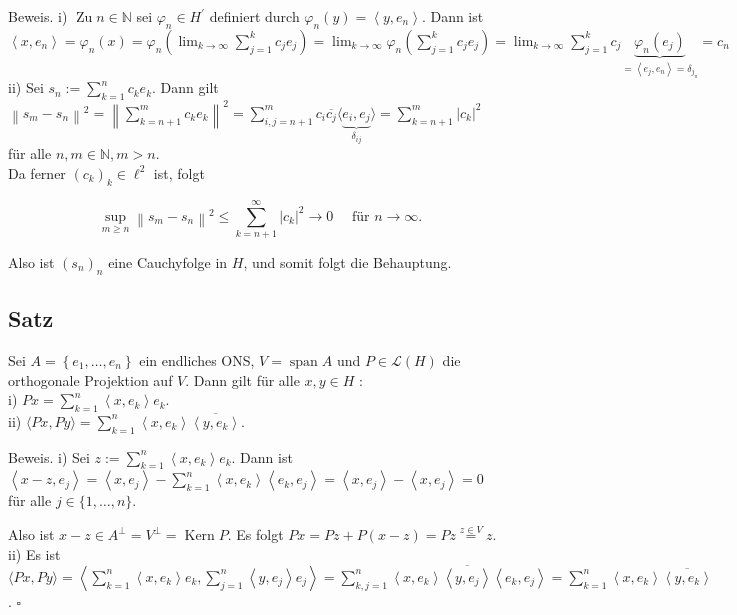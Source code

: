\documentclass[10pt, letterpaper]{article}
\begin{document}
Beweis. i) $\operatorname{Zu} n \in \mathbb{N}$ sei $\varphi_{n} \in H^{\prime}$ definiert durch $\varphi_{n}(y)=\left\langle y, e_{n}\right\rangle$. Dann ist\\
$\left\langle x, e_{n}\right\rangle=\varphi_{n}(x)=\varphi_{n}\left(\lim _{k \rightarrow \infty} \sum_{j=1}^{k} c_{j} e_{j}\right)=\lim _{k \rightarrow \infty} \varphi_{n}\left(\sum_{j=1}^{k} c_{j} e_{j}\right)=\lim _{k \rightarrow \infty} \sum_{j=1}^{k} c_{j} \underbrace{\varphi_{n}\left(e_{j}\right)}_{=\left\langle e_{j}, e_{n}\right\rangle=\delta_{j_{n}}}=c_{n}$\\
ii) Sei $s_{n}:=\sum_{k=1}^{n} c_{k} e_{k}$. Dann gilt\\
$\left\|s_{m}-s_{n}\right\|^{2}=\left\|\sum_{k=n+1}^{m} c_{k} e_{k}\right\|^{2}=\sum_{i, j=n+1}^{m} c_{i} \overline{c_{j}}\langle\underbrace{e_{i}, e_{j}}_{\delta_{i j}}\rangle=\sum_{k=n+1}^{m}\left|c_{k}\right|^{2} \quad$ für alle $n, m \in \mathbb{N}, m>n$.\\
Da ferner $\left(c_{k}\right)_{k} \in \ell^{2}$ ist, folgt

$$
\sup _{m \geq n}\left\|s_{m}-s_{n}\right\|^{2} \leq \sum_{k=n+1}^{\infty}\left|c_{k}\right|^{2} \rightarrow 0 \quad \text { für } n \rightarrow \infty .
$$

Also ist $\left(s_{n}\right)_{n}$ eine Cauchyfolge in $H$, und somit folgt die Behauptung.

\subsection*{Satz}
Sei $A=\left\{e_{1}, \ldots, e_{n}\right\}$ ein endliches ONS, $V=\operatorname{span} A$ und $P \in \mathcal{L}(H)$ die orthogonale Projektion auf $V$. Dann gilt für alle $x, y \in H$ :\\
i) $P x=\sum_{k=1}^{n}\left\langle x, e_{k}\right\rangle e_{k}$.\\
ii) $\langle P x, P y\rangle=\sum_{k=1}^{n}\left\langle x, e_{k}\right\rangle \overline{\left\langle y, e_{k}\right\rangle}$.

Beweis. i) Sei $z:=\sum_{k=1}^{n}\left\langle x, e_{k}\right\rangle e_{k}$. Dann ist\\
$\left\langle x-z, e_{j}\right\rangle=\left\langle x, e_{j}\right\rangle-\sum_{k=1}^{n}\left\langle x, e_{k}\right\rangle\left\langle e_{k}, e_{j}\right\rangle=\left\langle x, e_{j}\right\rangle-\left\langle x, e_{j}\right\rangle=0 \quad$ für alle $j \in\{1, \ldots, n\}$.

Also ist $x-z \in A^{\perp}=V^{\perp}=\operatorname{Kern} P$. Es folgt $P x=P z+P(x-z)=P z \stackrel{z \in V}{=} z$.\\
ii) Es ist\\
$\langle P x, P y\rangle=\left\langle\sum_{k=1}^{n}\left\langle x, e_{k}\right\rangle e_{k}, \sum_{j=1}^{n}\left\langle y, e_{j}\right\rangle e_{j}\right\rangle=\sum_{k, j=1}^{n}\left\langle x, e_{k}\right\rangle \overline{\left\langle y, e_{j}\right\rangle}\left\langle e_{k}, e_{j}\right\rangle=\sum_{k=1}^{n}\left\langle x, e_{k}\right\rangle \overline{\left\langle y, e_{k}\right\rangle}$. \(\square\)
\end{document}
